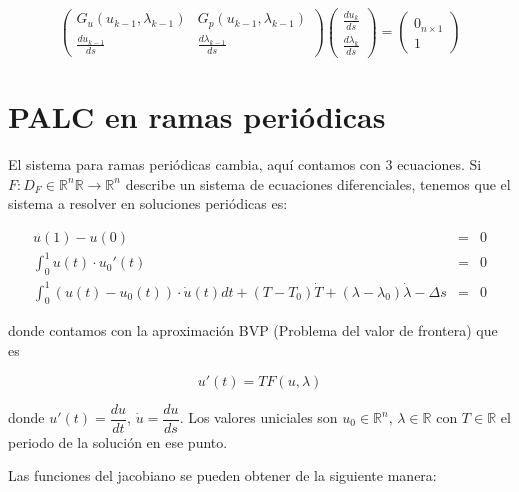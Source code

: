 \documentclass[10pt,a4paper]{article}
\begin{document}
$$\begin{pmatrix}
G_{u}(u_{k-1},\lambda_{k-1}) & G_{p}(u_{k-1},\lambda_{k-1}) \\
\frac{du_{k-1}}{ds} & \frac{d\lambda_{k-1}}{ds}
\end{pmatrix}\begin{pmatrix}
\frac{du_{k}}{ds} \\
\frac{d\lambda_{k}}{ds}
\end{pmatrix} = \begin{pmatrix}
0_{n\times 1} \\
1
\end{pmatrix}$$

\section{PALC en ramas periódicas}

El sistema para ramas periódicas cambia, aquí contamos con 3 ecuaciones. Si $F:D_{F}\in\mathbb{R}^{n}\mathbb{R} \to \mathbb{R}^{n}$ describe un sistema de ecuaciones diferenciales, tenemos que el sistema a resolver en soluciones periódicas es:

$$\begin{array}{rcl} 
u(1) - u(0) & = & 0 \\
\int_{0}^{1}u(t)\cdot u_{0}'(t) & = & 0 \\
\int_{0}^{1}(u(t)-u_{0}(t))\cdot\dot{u}(t)dt + (T-T_{0})\dot{T} + (\lambda - \lambda_{0})\dot{\lambda} - \Delta	 s & = & 0
\end{array}$$

donde contamos con la aproximación BVP (Problema del valor de frontera) que es

$$u'(t) = TF(u,\lambda)$$

donde $u'(t) = \dfrac{du}{dt}$, $\dot{u} = \dfrac{du}{ds}$. Los valores uniciales son $u_{0}\in\mathbb{R}^{n}$, $\lambda\in\mathbb{R}$ con $T\in \mathbb{R}$ el periodo de la solución en ese punto.

Las funciones del jacobiano se pueden obtener de la siguiente manera:
\end{document}

